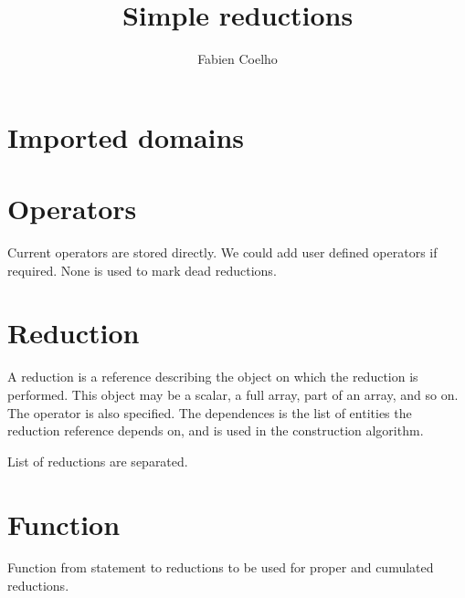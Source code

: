 \documentclass{article}
\title{Simple reductions}
\author{Fabien Coelho}
\begin{document}
\maketitle



\section{Imported domains}
\label{sec:import}


\section{Operators}
\label{sec:operators}

Current operators are stored directly.
We could add user defined operators if required.
None is used to mark dead reductions. 



\section{Reduction}
\label{sec:reduction}

A reduction is a reference describing the object on which the reduction is
performed. This object may be a scalar, a full array, part of an array,
and so on. The operator is also specified. The dependences is the list of
entities the reduction reference depends on, and is used in the
construction algorithm. 


List of reductions are separated.



\section{Function}
\label{sec:function}

Function from statement to reductions to be used for proper and cumulated
reductions. 

\end{document}
